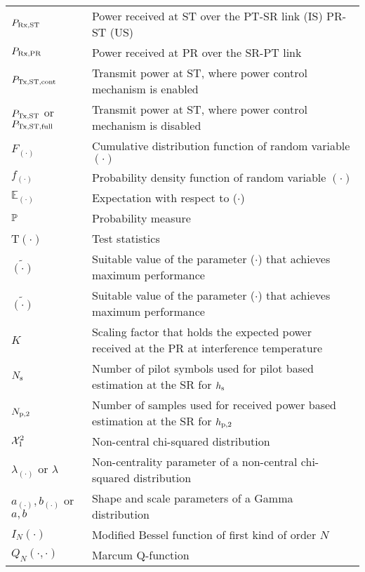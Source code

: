 \begin{longtable}{p{}p{}}


	$P_{\text{Rx,ST}}$  		&	Power received at ST over the PT-SR link (IS) PR-ST (US) \\ 
	$P_{\text{Rx,PR}}$  		&	Power received at PR over the SR-PT link \\

	$P_{\text{Tx,ST,cont}}$	  		&  	Transmit power at ST, where power control mechanism is enabled	\\
	$P_{\text{Tx,ST}}$ or $P_{\text{Tx,ST,full}}$ 	&  	Transmit power at ST, where power control mechanism is disabled	\\
	
       $F_{(\cdot)}$            &       Cumulative distribution function of random variable $(\cdot)$ \\
       $f_{(\cdot)}$            &       Probability density function of random variable $(\cdot)$ \\
       $\mathbb E_{(\cdot)}$    &       Expectation with respect to ($\cdot$) \\
       $\mathbb P$                     &       Probability measure \\
       T$(\cdot)$  	        &       Test statistics \\
       $\tilde{(\cdot)}$        &       Suitable value of the parameter ($\cdot$) that achieves maximum performance \\
       $\tilde{(\cdot)}$        &       Suitable value of the parameter ($\cdot$) that achieves maximum performance \\
       $K$                      &       Scaling factor that holds the expected power received at the PR at interference temperature  \\
       $N_{\text{s}}$                    &       Number of pilot symbols used for pilot based estimation at the SR for $h_{\text{s}}$ \\
       $N_{\text{p,2}}$                    &       Number of samples used for received power based estimation at the SR for $h_{\text{p,2}}$ \\
       $\ncchi2$                &       Non-central chi-squared distribution \\
       $\lambda_{(\cdot)}$ or $\lambda$       &       Non-centrality parameter of a non-central chi-squared distribution \\
       $a_{(\cdot)}, b_{(\cdot)}$ or $a, b$   &       Shape and scale parameters of a Gamma distribution \\

       $I_{N}(\cdot)$	        &	Modified Bessel function of first kind of order $N$ \\		
       $Q_{N}(\cdot, \cdot)$	&	Marcum Q-function \\		
\end{longtable}
  



